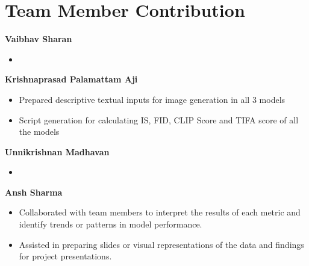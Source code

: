 \documentclass{article}
\begin{document}


\section{Team Member Contribution}
\textbf{Vaibhav Sharan}
\begin{itemize}
    \item 
\end{itemize}
\textbf{Krishnaprasad Palamattam Aji}
\begin{itemize}
    \item Prepared descriptive textual inputs for image generation in all 3 models
    \item Script generation for calculating IS, FID, CLIP Score and TIFA score of all the models
\end{itemize}
\textbf{Unnikrishnan Madhavan}
\begin{itemize}
    \item 
\end{itemize}
\textbf{Ansh Sharma}
\begin{itemize}
    \item Collaborated with team members to interpret the results of each metric and identify trends or patterns in model performance.    
    \item Assisted in preparing slides or visual representations of the data and findings for project presentations.
\end{itemize}
\end{document}
